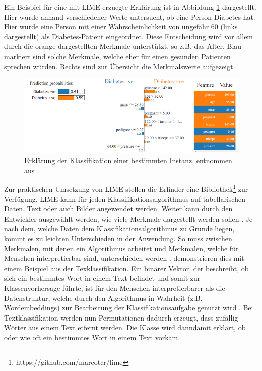 Ein Beispiel für eine mit LIME erzuegte Erklärung ist in Abbildung \ref{Fig:Lime-Beispiel} dargestellt. Hier wurde anhand verschiedener Werte untersucht, ob eine Person Diabetes hat. Hier wurde eine Person mit einer Wahrscheinlichkeit von ungefähr 60 (links dargestellt) als Diabetes-Patient eingeordnet. Diese Entscheidung wird vor allem durch die orange dargestellten Merkmale unterstützt, so z.B. das Alter. Blau markiert sind solche Merkmale, welche eher für einen gesunden Patienten sprechen würden. Rechts sind zur Übersicht die Merkmalswerte aufgezeigt.
\begin{figure}
    \centering
    \includegraphics[scale=0.45]{pic/MA-Bilder/Literaturrecherche/LIME-Erklaerung-Beispiel.PNG}
    \caption{Erklärung der Klassifikation einer bestimmten Instanz, entnommen aus \cite{LIME-beispiel}}
    \label{Fig:Lime-Beispiel}
\end{figure}
Zur praktischen Umsetzung von LIME stellen die Erfinder eine Bibliothek\footnote{https://github.com/marcotcr/lime} zur Verfügung. LIME kann für jeden Klassifikationsalgorithmus auf tabellarischen Daten, Text oder auch Bilder angewendet werden. Weiter kann durch den Entwickler ausgewählt werden, wie viele Merkmale dargestellt werden sollen \cite{molnar2022}. Je nach dem, welche Daten dem Klassifikationsalgorithmus zu Grunde liegen, kommt es zu leichten Unterschieden in der Anwendung. So muss zwischen Merkmalen, mit denen ein Algorithmus arbeitet und Merkmalen, welche für Menschen interpretierbar sind, unterschieden werden \cite{ribeiro2016should}. \textcite{ribeiro2016should} demonstrieren dies mit einem Beispiel aus der Texklassifikation. Ein binärer Vektor, der beschreibt, ob sich ein bestimmtes Wort in einem Text befindet und somit zur Klassenvorhersage führte, ist für den Menschen interpretierbarer als die Datenstruktur, welche durch den Algorithmus in Wahrheit (z.B. Wordembeddings) zur Bearbeitung der Klassifikationsaufgabe genutzt wird \cite{ribeiro2016should}. Bei Textklassifikation werden nun Permutationen dadurch erzeugt, dass zufällig Wörter aus einem Text etfernt werden. Die Klasse wird danndamit erklärt, ob oder wie oft ein bestimmtes Wort in einem Text vorkam.

